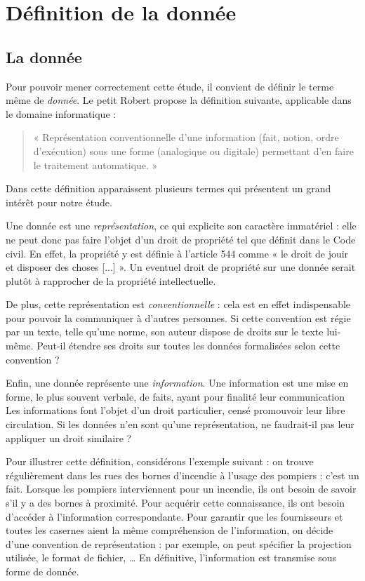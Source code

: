 \section{Définition de la donnée}

\subsection{La donnée}

Pour pouvoir mener correctement cette étude, il convient de définir le
terme même de \emph{donnée}. Le petit Robert \cite{robert2007} propose
la définition suivante, applicable dans le domaine informatique :

\begin{quotation}
  « Représentation conventionnelle d'une information (fait, notion,
  ordre d'exécution) sous une forme (analogique ou digitale)
  permettant d'en faire le traitement automatique. »
\end{quotation}

Dans cette définition apparaissent plusieurs termes qui présentent un
grand intérêt pour notre étude.

Une donnée est une \emph{représentation}, ce qui explicite son
caractère immatériel : elle ne peut donc pas faire l'objet d'un droit
de propriété tel que définit dans le Code civil. En effet, la
propriété y est définie à l'article 544 comme « le droit de jouir et
disposer des choses [...] ». Un eventuel droit de propriété sur une
donnée serait plutôt à rapprocher de la propriété intellectuelle.

De plus, cette représentation est \emph{conventionnelle} : cela est en
effet indispensable pour pouvoir la communiquer à d'autres personnes.
Si cette convention est régie par un texte, telle qu'une norme, son
auteur dispose de droits sur le texte lui-même. Peut-il étendre ses
droits sur toutes les données formalisées selon cette convention ?

Enfin, une donnée représente une \emph{information}. Une information
est une mise en forme, le plus souvent verbale, de faits, ayant pour
finalité leur communication \cite{littreInfo} \cite{larousseInfo} Les
informations font l'objet d'un droit particulier, censé promouvoir
leur libre circulation. Si les données n'en sont qu'une
représentation, ne faudrait-il pas leur appliquer un droit similaire ?

Pour illustrer cette définition, considérons l'exemple suivant : on
trouve régulièrement dans les rues des bornes d'incendie à l'usage des
pompiers : c'est un fait. Lorsque les pompiers interviennent pour un
incendie, ils ont besoin de savoir s'il y a des bornes à
proximité. Pour acquérir cette connaissance, ils ont besoin d'accéder
à l'information correspondante. Pour garantir que les fournisseurs et
toutes les casernes aient la même compréhension de l'information, on
décide d'une convention de représentation : par exemple, on peut
spécifier la projection utilisée, le format de fichier, \dots{} En
définitive, l'information est transmise sous forme de donnée.


